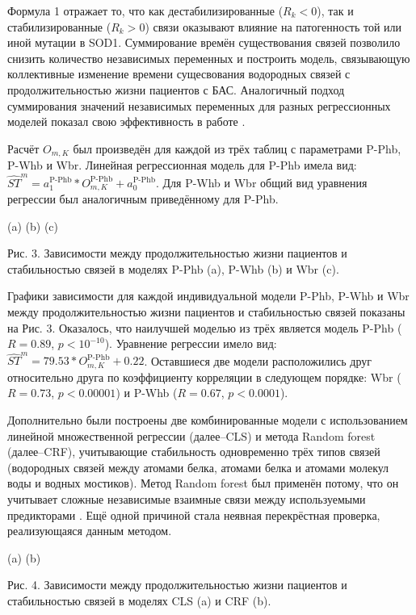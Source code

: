 Формула 1 отражает то, что как дестабилизированные ($R_k < 0$), так и стабилизированные ($R_k > 0$) связи оказывают влияние на патогенность той или иной мутации в SOD1. Суммирование времён существования связей позволило снизить количество независимых переменных и построить модель, связывающую  коллективные изменение времени сущесвования водородных связей с продолжительностью жизни пациентов с БАС. Аналогичный подход суммирования значений независимых переменных для разных регрессионных моделей показал свою эффективность в работе \cite{Wang2008}.

Расчёт $O_{m, K}$ был произведён для каждой из трёх таблиц с параметрами P-Phb, P-Whb и Wbr.
Линейная регрессионная модель для P-Phb имела вид: $\widehat{ST}^m = a_{1}^{\text{P-Phb}}*O_{m, K}^{\text{P-Phb}}+a_{0}^{\text{P-Phb}}$. Для P-Whb и Wbr общий вид уравнения регрессии был аналогичным приведённому для P-Phb.

(a)
(b)
(c)

Рис. 3. Зависимости между продолжительностью жизни пациентов и стабильностью связей в моделях P-Phb (a), P-Whb (b) и Wbr (c). 

Графики зависимости для каждой индивидуальной модели P-Phb, P-Whb и Wbr между продолжительностью жизни пациентов и стабильностью связей  показаны на Рис. 3. Оказалось, что наилучшей моделью из трёх является модель  P-Phb ($R=0.89$, $p<10^{-10}$). Уравнение регрессии имело вид: $\widehat{ST}^m = 79.53*O_{m, K}^{\text{P-Phb}}+0.22$. Оставшиеся две модели расположились друг относительно друга по коэффициенту корреляции в следующем порядке:  Wbr ($R=0.73$, $p<0.00001$) и P-Whb ($R=0.67$, $p<0.0001$). 

Дополнительно были построены две комбинированные модели с использованием линейной множественной регрессии (далее--CLS) и метода Random forest \cite{Breiman2001} (далее--CRF), учитывающие стабильность одновременно трёх типов связей (водородных связей между атомами белка, атомами белка и атомами молекул воды и водных мостиков). Метод Random forest был применён потому, что он учитывает сложные независимые взаимные связи между используемыми предикторами \cite{Karatayev2015}. Ещё одной причиной стала неявная перекрёстная проверка, реализующаяся данным методом.

(a)
(b)

Рис. 4. Зависимости между продолжительностью жизни пациентов и стабильностью связей в моделях CLS (a) и CRF (b).

